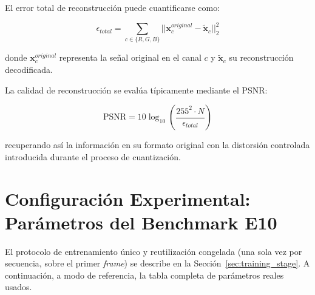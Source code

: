    El error total de reconstrucción puede cuantificarse como:
   
   \begin{equation}
       \epsilon_{total} = \sum_{c \in \{R,G,B\}} ||\mathbf{x}_c^{original} - \tilde{\mathbf{x}}_c||_2^2
   \end{equation}
   
   donde $\mathbf{x}_c^{original}$ representa la señal original en el canal $c$ y $\tilde{\mathbf{x}}_c$ su reconstrucción decodificada.
   
   La calidad de reconstrucción se evalúa típicamente mediante el PSNR:
   
   \begin{equation}
       \text{PSNR} = 10 \log_{10} \left( \frac{255^2 \cdot N}{\epsilon_{total}} \right)
   \end{equation}
   
   recuperando así la información en su formato original con la distorsión controlada introducida durante el proceso de cuantización.


\section{Configuración Experimental: Parámetros del Benchmark E10}
\label{sec:metodologia_e10_extensions}


    El protocolo de entrenamiento único y reutilización congelada (una sola vez por secuencia,
    sobre el primer \textit{frame}) se describe en la Sección~\ref{sec:training_stage}. A
    continuación, a modo de referencia, la tabla completa de parámetros reales usados.

